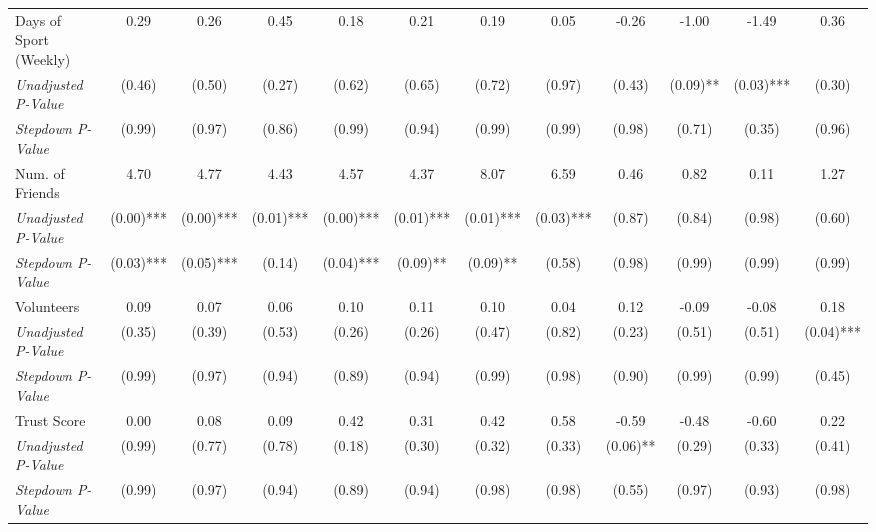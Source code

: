\begin{tabular}{l c c c c c c c c c c c}
Days of Sport (Weekly) & 0.29 & 0.26 & 0.45 & 0.18 & 0.21 & 0.19 & 0.05 & -0.26 & -1.00 & -1.49 & 0.36 \\
\quad \textit{Unadjusted P-Value} & (0.46) & (0.50) & (0.27) & (0.62) & (0.65) & (0.72) & (0.97) & (0.43) & (0.09)** & (0.03)*** & (0.30) \\
\quad \textit{Stepdown P-Value} & (0.99) & (0.97) & (0.86) & (0.99) & (0.94) & (0.99) & (0.99) & (0.98) & (0.71) & (0.35) & (0.96) \\
Num. of Friends & 4.70 & 4.77 & 4.43 & 4.57 & 4.37 & 8.07 & 6.59 & 0.46 & 0.82 & 0.11 & 1.27 \\
\quad \textit{Unadjusted P-Value} & (0.00)*** & (0.00)*** & (0.01)*** & (0.00)*** & (0.01)*** & (0.01)*** & (0.03)*** & (0.87) & (0.84) & (0.98) & (0.60) \\
\quad \textit{Stepdown P-Value} & (0.03)*** & (0.05)*** & (0.14) & (0.04)*** & (0.09)** & (0.09)** & (0.58) & (0.98) & (0.99) & (0.99) & (0.99) \\
Volunteers & 0.09 & 0.07 & 0.06 & 0.10 & 0.11 & 0.10 & 0.04 & 0.12 & -0.09 & -0.08 & 0.18 \\
\quad \textit{Unadjusted P-Value} & (0.35) & (0.39) & (0.53) & (0.26) & (0.26) & (0.47) & (0.82) & (0.23) & (0.51) & (0.51) & (0.04)*** \\
\quad \textit{Stepdown P-Value} & (0.99) & (0.97) & (0.94) & (0.89) & (0.94) & (0.99) & (0.98) & (0.90) & (0.99) & (0.99) & (0.45) \\
Trust Score & 0.00 & 0.08 & 0.09 & 0.42 & 0.31 & 0.42 & 0.58 & -0.59 & -0.48 & -0.60 & 0.22 \\
\quad \textit{Unadjusted P-Value} & (0.99) & (0.77) & (0.78) & (0.18) & (0.30) & (0.32) & (0.33) & (0.06)** & (0.29) & (0.33) & (0.41) \\
\quad \textit{Stepdown P-Value} & (0.99) & (0.97) & (0.94) & (0.89) & (0.94) & (0.98) & (0.98) & (0.55) & (0.97) & (0.93) & (0.98) \\
\bottomrule
\end{tabular}
